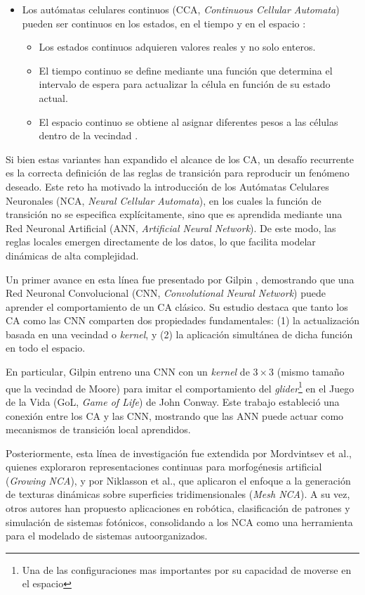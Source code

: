 \begin{itemize}
	\item Los autómatas celulares continuos (CCA, \textit{Continuous Cellular Automata}) pueden ser continuos en los estados, en el tiempo y en el espacio \cite{wolfram2002}:
	\begin{itemize}
		\item Los estados continuos adquieren valores reales y no solo enteros.
		\item El tiempo continuo se define mediante una función que determina el intervalo de espera para actualizar la célula en función de su estado actual.
		\item El espacio continuo se obtiene al asignar diferentes pesos a las células dentro de la vecindad \cite{beckerCCA}.
	\end{itemize}
\end{itemize}

Si bien estas variantes han expandido el alcance de los CA, un desafío recurrente es la correcta definición de las reglas de transición para reproducir un fenómeno deseado. Este reto ha motivado la introducción de los Autómatas Celulares Neuronales (NCA, \textit{Neural Cellular Automata}), en los cuales la función de transición no se especifica explícitamente, sino que es aprendida mediante una Red Neuronal Artificial (ANN, \textit{Artificial Neural Network}). De este modo, las reglas locales emergen directamente de los datos, lo que facilita modelar dinámicas de alta complejidad.


Un primer avance en esta línea fue presentado por Gilpin \cite{gilpinNCA}, demostrando que una Red Neuronal Convolucional (CNN, \textit{Convolutional Neural Network}) puede aprender el comportamiento de un CA clásico. Su estudio destaca que tanto los CA como las CNN comparten dos propiedades fundamentales: (1) la actualización basada en una vecindad o \textit{kernel}, y (2) la aplicación simultánea de dicha función en todo el espacio.

En particular, Gilpin entreno una CNN con un \textit{kernel} de $3 \times 3$ (mismo tamaño que la vecindad de Moore) para imitar el comportamiento del \textit{glider}\footnote{Una de las configuraciones mas importantes por su capacidad de moverse en el espacio} en el Juego de la Vida (GoL, \textit{Game of Life}) de John Conway. Este trabajo estableció una conexión entre los CA y las CNN, mostrando que las ANN puede actuar como mecanismos de transición local aprendidos.

Posteriormente, esta línea de investigación fue extendida por Mordvintsev et al., quienes exploraron representaciones continuas para morfogénesis artificial (\textit{Growing NCA}), y por Niklasson et al., que aplicaron el enfoque a la generación de texturas dinámicas sobre superficies tridimensionales (\textit{Mesh NCA}). A su vez, otros autores han propuesto aplicaciones en robótica, clasificación de patrones y simulación de sistemas fotónicos, consolidando a los NCA como una herramienta para el modelado de sistemas autoorganizados.